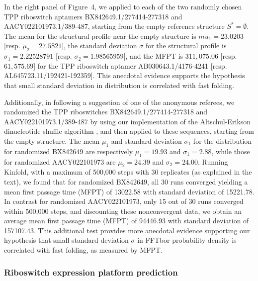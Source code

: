 In the right panel of Figure~4, we
applied \fftbor to each of the two randomly chosen TPP riboswitch
aptamers BX842649.1/277414-277318 and AACY022101973.1/389-487, starting
from the empty reference structure $S^*=\emptyset$.
The mean for the \fftbor structural profile near the empty
structure is $mu_1=23.0203$  [resp. $\mu_2=27.5821$], the
standard deviation $\sigma$ for the \fftbor structural profile
is $\sigma_1=2.22528791$  [resp. $\sigma_2=1.98565959$], and the \kinfold MFPT is
$311,075.06$ [resp. $61,575.69$] for the TPP riboswitch aptamer
AB030643.1/4176-4241 [resp.  AL645723.11/192421-192359]. This anecdotal evidence supports the hypothesis that small standard deviation in \fftbor distribution is correlated with fast folding.

Additionally, in following a suggestion of one of the anonymous referees, we randomized the TPP riboswitches BX842649.1/277414-277318 and AACY022101973.1/389-487 by using our implementation of the Altschul-Erikson dinucleotide shuffle algorithm
\cite{altschulErikson:dinucleotideShuffle}, and then applied \fftbor to these sequences, starting from the empty structure.  The mean $\mu_1$ and standard deviation $\sigma_1$ for the \fftbor distribution for randomized BX842649 are respectively $\mu_1=19.93$ and $\sigma_1=2.88$, while those for randomized AACY022101973 are $\mu_2= 24.39$ and $\sigma_2=24.00$. Running Kinfold, with a maximum of 500,000 steps with 30 replicates (as explained in the text), we found that for randomized BX842649, all 30 runs converged yielding a mean first passage time (MFPT) of 13022.58  with standard deviation of 15221.78. In contrast for randomized AACY022101973, only 15 out of 30 runs converged within 500,000 steps, and discounting these nonconvergent data, we obtain an average mean first passage time (MFPT) of 94446.93  with standard deviation of 157107.43. This additional test provides more anecdotal evidence supporting our hypothesis that small standard deviation $\sigma$ in FFTbor probability density is correlated with fast folding, as measured by MFPT.
%
%

\subsubsection*{Riboswitch expression platform prediction}

